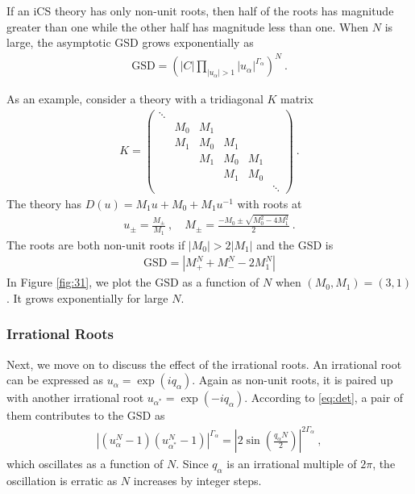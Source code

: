 \documentclass[aps,prb,twocolumn,superscriptaddress,floatfix,10pt,nofootinbib]{revtex4-2}
\newcommand{\ie}{\begin{equation}\begin{aligned}}
\newcommand{\fe}{\end{aligned}\end{equation}}
\theoremstyle{definition}
\begin{document}
If an iCS theory has only non-unit roots, then half of the roots has magnitude greater than one while the other half has magnitude less than one. When $N$ is large, the asymptotic GSD grows exponentially as
\ie
\text{GSD}=\left(|C|\prod_{|u_\alpha|>1}|u_\alpha|^{\Gamma_\alpha}\right)^N~.
\fe

As an example, consider a theory with a tridiagonal $K$ matrix
\ie\label{eq:tridiagonal}
K=\left(
\begin{array}{ccccccccccc}
\ddots&&&\\
&M_0&M_1&&\\
&M_1&M_0&M_1&\\
&&M_1&M_0&M_1\\
& &&M_1&M_0&\\
&&&&&\ddots
\end{array}
\right)~.
\fe
The theory has $D(u)=M_1u+M_0+M_1u^{-1}$ with roots at
\ie
u_\pm=\frac{M_\pm}{M_1}~,\quad M_\pm=\frac{-M_0\pm\sqrt{M_0^2-4M_1^2}}{2}~.
\fe
The roots are both non-unit roots if $|M_0|>2|M_1|$ and the GSD is
\ie\label{eq:GSD_31}
\text{GSD}=\left|M_+^N+M_-^N-2M_1^N\right|
\fe
In Figure \ref{fig:31}, we plot the GSD as a function of $N$ when $(M_0,M_1)=(3,1)$. It grows exponentially for large $N$.


\subsubsection{Irrational Roots}

Next, we move on to discuss the effect of the irrational roots. An irrational root can be expressed as $u_\alpha=\exp(iq_\alpha)$. Again as non-unit roots, it is paired up with another irrational root $u_{\alpha^*}=\exp(-iq_\alpha)$. According to \eqref{eq:det}, a pair of them contributes to the GSD as
\ie
|(u_\alpha^N-1)(u_{\alpha^*}^{N}-1)|^{\Gamma_\alpha}=\left|2\sin\left(\frac{q_\alpha N}{2}\right)\right|^{2\Gamma_\alpha}~,
\fe
which oscillates as a function of $N$. Since $q_\alpha$ is an irrational multiple of $2\pi$, the oscillation is erratic as $N$ increases by integer steps.
\end{document}
